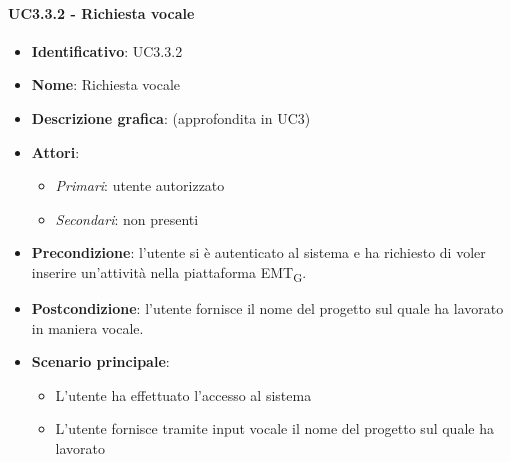 \paragraph{UC3.3.2 - Richiesta vocale}
\begin{itemize}
   \item \textbf{Identificativo}: UC3.3.2
   \item \textbf{Nome}: Richiesta vocale
   \item \textbf{Descrizione grafica}: (approfondita in UC3)
   \item \textbf{Attori}:
   \begin{itemize} 
       \item \textit{Primari}: utente autorizzato
       \item \textit{Secondari}: non presenti
   \end{itemize}
       \item \textbf{Precondizione}: l'utente si è autenticato al sistema e ha richiesto di voler inserire un'attività nella piattaforma EMT\textsubscript{G}. 
       \item \textbf{Postcondizione}: l'utente fornisce il nome del progetto sul quale ha lavorato in maniera vocale.
    \item \textbf{Scenario principale}: 
       \begin{itemize}
           \item L'utente ha effettuato l'accesso al sistema 
           \item L'utente fornisce tramite input vocale il nome del progetto sul quale ha lavorato
       \end{itemize}
\end{itemize}

